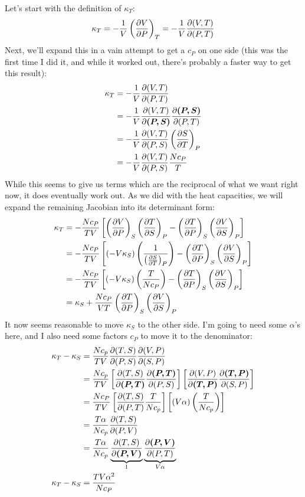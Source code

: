 \documentclass[a4paper,twoside]{article}
\begin{document}
\begin{problem}
    Let's start with the definition of $ \kappa_T $:
    \begin{equation}
        \kappa_T = - \frac{1}{V} \left( \pdv{V}{P} \right)_T = - \frac{1}{V} \pdv{(V,T)}{(P,T)}
    \end{equation}
    Next, we'll expand this in a vain attempt to get a $ c_P $ on one side (this was the first time I did it, and while it worked out, there's probably a faster way to get this result):
    \begin{align}
        \kappa_T &= - \frac{1}{V} \pdv{(V,T)}{(P,T)} \\
        &= - \frac{1}{V} \pdv{(V,T)}{\bm{(P,S)}} \pdv{\bm{(P,S)}}{(P,T)} \\
        &= - \frac{1}{V} \pdv{(V,T)}{(P,S)}\left( \pdv{S}{T} \right)_P \\
        &= - \frac{1}{V} \pdv{(V,T)}{(P,S)} \frac{N c_P}{T}
    \end{align}
    While this seems to give us terms which are the reciprocal of what we want right now, it does eventually work out. As we did with the heat capacities, we will expand the remaining Jacobian into its determinant form:
    \begin{align}
        \kappa_T &= - \frac{N c_P}{TV} \left[ \left( \pdv{V}{P} \right)_S \left( \pdv{T}{S} \right)_P - \left( \pdv{T}{P} \right)_S \left( \pdv{V}{S} \right)_P \right] \\
        &= - \frac{N c_P}{TV} \left[ \left( -V \kappa_S \right) \left( \frac{1}{\left( \pdv{S}{T} \right)_P}\right) - \left( \pdv{T}{P} \right)_S \left( \pdv{V}{S} \right)_P \right] \\
        &= - \frac{Nc_P}{TV} \left[ \left( -V \kappa_S \right) \left( \frac{T}{Nc_P} \right) - \left( \pdv{T}{P} \right)_S \left( \pdv{V}{S} \right)_P \right] \\
        &= \kappa_S + \frac{N c_P}{VT} \left( \pdv{T}{P} \right)_S \left( \pdv{V}{S} \right)_P
    \end{align}
    It now seems reasonable to move $ \kappa_S $ to the other side. I'm going to need some $ \alpha $'s here, and I also need some factors $ c_P $ to move it to the denominator:
    \begin{align}
        \kappa_T - \kappa_S &= \frac{Nc_p}{TV} \pdv{(T,S)}{(P,S)} \pdv{(V,P)}{(S,P)} \\
        &= \frac{Nc_p}{TV} \left[ \pdv{(T,S)}{\bm{(P,T)}} \pdv{\bm{(P,T)}}{(P,S)} \right] \left[ \pdv{(V,P)}{\bm{(T,P)}} \pdv{\bm{(T,P)}}{(S,P)} \right] \\
        &= \frac{Nc_P}{TV} \left[ \pdv{(T,S)}{(P,T)} \frac{T}{Nc_p} \right] \left[ (V \alpha) \left( \frac{T}{Nc_p} \right) \right] \\
        &= \frac{T\alpha}{N c_p} \pdv{(T,S)}{(P,V)} \\
        &= \frac{T \alpha}{N c_p} \underbrace{\pdv{(T,S)}{\bm{(P,V)}}}_{1} \underbrace{\pdv{\bm{(P,V)}}{(P,T)}}_{V \alpha} \\
        \kappa_T - \kappa_S &= \frac{TV \alpha^2}{N c_P} 
    \end{align}
\end{problem}
\end{document}
